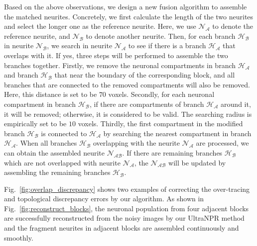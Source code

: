 {Based on the above observations, we design a new fusion algorithm to assemble the matched neurites.
Concretely, we first calculate the length of the two neurites and select the longer one as the reference neurite. Here, we use $\mathcal{N_A}$ to denote the reference neurite, and $\mathcal{N_B}$ to denote another neurite.
Then, for each branch $\mathcal{H_B}$ in neurite $\mathcal{N_B}$, we search in neurite $\mathcal{N_A}$ to see if there is a branch $\mathcal{H_A}$ that overlaps with it.
%
If yes, three steps will be performed to assemble the two branches together.
Firstly, we remove the neuronal compartments in branch $\mathcal{H_A}$ and branch $\mathcal{H_B}$ that near the boundary of the corresponding block, and all branches that are connected to the removed compartments will also be removed. Here, this distance is set to be $70$ voxels.
Secondly, for each neuronal compartment in branch $\mathcal{H_B}$, if there are compartments of branch $\mathcal{H_A}$ around it, it will be removed; otherwise, it is considered to be valid. The searching radius is empirically set to be $10$ voxels.
Thirdly, the first compartment in the modified branch $\mathcal{H_B}$ is connected to $\mathcal{H_A}$ by searching the nearest compartment in branch $\mathcal{H_A}$. 
When all branches $\mathcal{H_B}$ overlapping with the neurite $\mathcal{N_A}$ are processed, we can obtain the assembled neurite $\mathcal{N_{AB}}$.
If there are remaining branches $\mathcal{H_B}$ which are not overlapped with neurite $\mathcal{N_A}$, the $\mathcal{N_{AB}}$ will be updated by assembling the remaining branches $\mathcal{H_B}$.



Fig.~\ref{fig:overlap_discrepancy} shows two examples of correcting the over-tracing and topological discrepancy errors by our algorithm.
As shown in Fig.~\ref{fig:reconstruct_blocks}, the neuronal population from four adjacent blocks are successfully reconstructed from the noisy images by our UltraNPR method and the fragment neurites in adjacent blocks are assembled continuously and smoothly.


}
